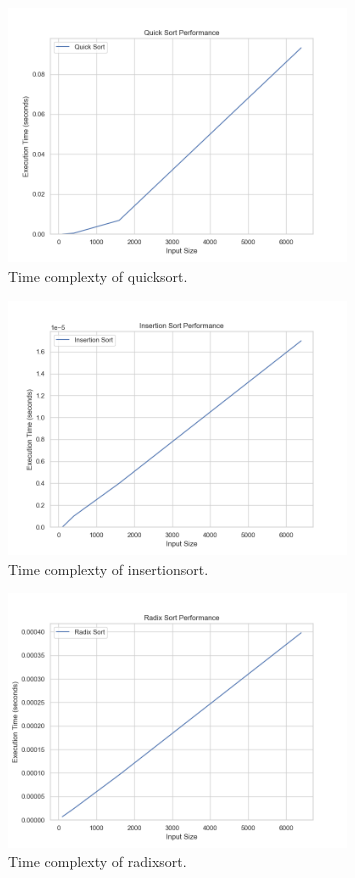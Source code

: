 \documentclass{article}
\begin{document}
\begin{figure}[h]
\centering
\includegraphics[width=0.8\textwidth]{../graph/quick_sort.png}
\caption{Time complexty of quicksort.}
\label{avg:best}
\end{figure}


\begin{figure}[h]
\centering
\includegraphics[width=0.8\textwidth]{../graph/insertion_sort.png}
\caption{Time complexty of insertionsort.}
\label{avg:best}
\end{figure}


\begin{figure}[h]
\centering
\includegraphics[width=0.8\textwidth]{../graph/radix_sort.png}
\caption{Time complexty of radixsort.}
\label{avg:best}
\end{figure}
\end{document}
